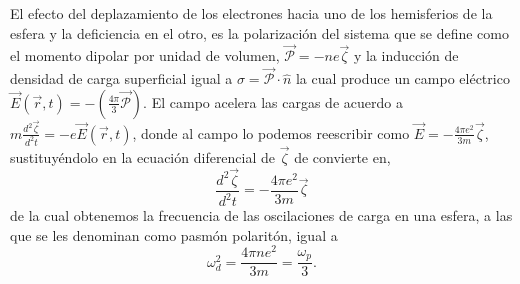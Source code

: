 \documentclass[12pt]{article}
\begin{document}
El efecto del deplazamiento de los electrones hacia uno de los
hemisferios de la esfera y la deficiencia en el otro, es la
polarización del sistema que se define como el momento dipolar por
unidad de volumen, $\vec{\mathcal{P}} =-ne\vec{\zeta}$ y la inducción
de densidad de carga superficial igual a $\sigma
=\vec{\mathcal{P}}\cdot \hat{n}$ la cual produce un campo eléctrico
$\vec{E}(\vec{r},t) = -\left(\frac{4\pi}{3}\vec{\mathcal{P}}\right)
$. El campo acelera las cargas de acuerdo a
$m\frac{d^{2}\vec{\zeta}}{d^{2}t}=-e\vec{E}(\vec{r},t)$, donde al
campo lo podemos reescribir como $\vec{E}= -\frac{4\pi
  e^{2}}{3m}\vec{\zeta}$, sustituyéndolo en la ecuación diferencial de
$\vec{\zeta}$ de convierte en,
\begin{equation}
  \frac{d^{2}\vec{\zeta}}{d^{2}t}= -\frac{4\pi e^{2}}{3m}\vec{\zeta}
  \label{polaritondifec}
\end{equation}
de la cual obtenemos la frecuencia de las oscilaciones de carga en una
esfera, a las que se les denominan como pasmón polaritón, igual a
\begin{equation}
  \omega_{d}^{2} = \frac{4\pi n e^{2}}{3m} = \frac{\omega_{p}}{3}.
\end{equation}
\end{document}

